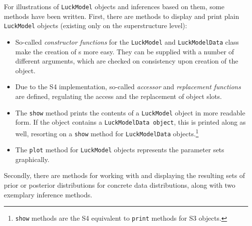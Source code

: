 For illustrations of \texttt{LuckModel} objects and inferences based on them, some methods have
been written. First, there are methods to display and print plain \texttt{LuckModel}
objects (existing only on the superstructure level):
\begin{itemize}
\item So-called \emph{constructor functions} for the \texttt{LuckModel} and \texttt{LuckModelData} class
   make the creation of \model s more easy. They can be supplied with a 
   number of different arguments, which are checked on consistency upon
   creation of the object.
\item Due to the S4 implementation, so-called \emph{accessor} and \emph{replacement functions}
   are defined, regulating the access and the replacement of object slots.
\item The \texttt{show} method prints the contents of a \texttt{LuckModel} object in more
   readable form. If the object contains a \texttt{LuckModelData object}, this is
   printed along as well, resorting on a \texttt{show} method for \texttt{LuckModelData}
   objects.\footnote{\texttt{show} methods are the S4 equivalent to \texttt{print} methods for S3 objects.}
\item The \texttt{plot} method for \texttt{LuckModel} objects represents the parameter sets graphically.
\end{itemize}
Secondly, there are methods for working with
and displaying the resulting sets of prior or posterior distributions
for concrete data distributions, along with two exemplary inference methods.
